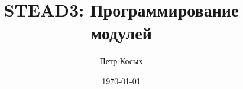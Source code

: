 
\usepackage{indentfirst}
\setmainlanguage{russian}
\title{STEAD3: Программирование модулей}
\author{Петр Косых}
\date{\today}
\sloppy

\maketitle
{
\hypersetup{linkcolor=black}
\renewcommand{\contentsname}{Оглавление}
\tableofcontents
\clearpage
}


